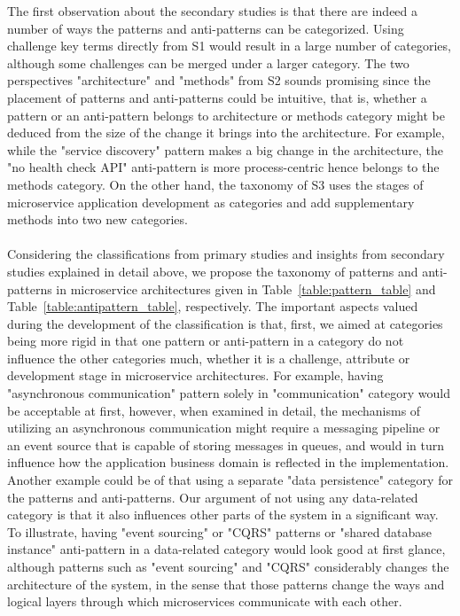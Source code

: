 \documentclass{Configuration_Files/PoliMi3i_thesis}
\begin{document}
The first observation about the secondary studies is that there are indeed a number of ways the patterns and anti-patterns can be categorized.
Using challenge key terms directly from S1 would result in a large number of categories, although some challenges can be merged under a larger category.
The two perspectives "architecture" and "methods" from S2 sounds promising since the placement of patterns and anti-patterns could be intuitive, that is, whether a pattern or an anti-pattern belongs to architecture or methods category might be deduced from the size of the change it brings into the architecture.
For example, while the "service discovery" pattern makes a big change in the architecture, the "no health check API" anti-pattern is more process-centric hence belongs to the methods category.
On the other hand, the taxonomy of S3 uses the stages of microservice application development as categories and add supplementary methods into two new categories.
\\
\\
Considering the classifications from primary studies and insights from secondary studies explained in detail above, we propose the taxonomy of patterns and anti-patterns in microservice architectures given in Table~\ref{table:pattern_table} and Table~\ref{table:antipattern_table}, respectively.
The important aspects valued during the development of the classification is that, first, we aimed at categories being more rigid in that one pattern or anti-pattern in a category do not influence the other categories much, whether it is a challenge, attribute or development stage in microservice architectures.
For example, having "asynchronous communication" pattern solely in "communication" category would be acceptable at first, however, when examined in detail, the mechanisms of utilizing an asynchronous communication might require a messaging pipeline or an event source that is capable of storing messages in queues, and would in turn influence how the application business domain is reflected in the implementation.
Another example could be of that using a separate "data persistence" category for the patterns and anti-patterns.
Our argument of not using any data-related category is that it also influences other parts of the system in a significant way.
To illustrate, having "event sourcing" or "CQRS" patterns or "shared database instance" anti-pattern in a data-related category would look good at first glance, although patterns such as "event sourcing" and "CQRS" considerably changes the architecture of the system, in the sense that those patterns change the ways and logical layers through which microservices communicate with each other.
\end{document}

